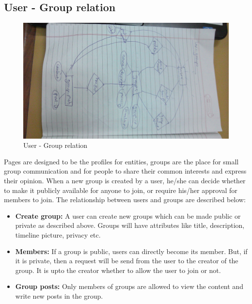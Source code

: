 \documentclass{article}
\begin{document}
\subsection{User - Group relation}
\begin{figure}[h]
\centering
\includegraphics[scale=0.2]{fig3.jpg}
\caption{User - Group relation}
\label{fig3}
\end{figure}
Pages are designed to be the profiles for entities, groups are the place for small group communication and for people to share their common interests and express their opinion. When a new group is created by a user, he/she can decide whether to make it publicly available for anyone to join, or require his/her approval for members to join. The relationship between users and groups are described below:
\begin{itemize}
\item \textbf{Create group:} A user can create new groups which can be made public or private as described above. Groups will have attributes like title, description, timeline picture, privacy etc.
\item \textbf{Members:} If a group is public, users can directly become its member. But, if it is private, then a request will be send from the user to the creator of the group. It is upto the creator whether to allow the user to join or not.
\item \textbf{Group posts:} Only members of groups are allowed to view the content and write new posts in the group.
\end{itemize}
\end{document}

